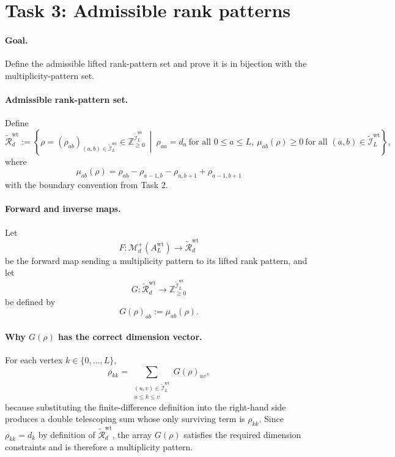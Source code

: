 \section*{Task 3: Admissible rank patterns}

\paragraph{Goal.}
Define the admissible lifted rank-pattern set and prove it is in bijection with
the multiplicity-pattern set.

\paragraph{Admissible rank-pattern set.}
Define
\[
\widetilde{\mathcal R}_d^{\mathrm{wt}}
:=
\left\{
\rho=(\rho_{ab})_{(a,b)\in \widetilde{\mathcal I}_L^{\mathrm{wt}}}
\in
\mathbb Z_{\ge 0}^{\widetilde{\mathcal I}_L^{\mathrm{wt}}}
\ \middle|\
\rho_{aa}=d_a\ \text{for all }0\le a\le L,\
\mu_{ab}(\rho)\ge 0\ \text{for all }(a,b)\in \widetilde{\mathcal I}_L^{\mathrm{wt}}
\right\},
\]
where
\[
\mu_{ab}(\rho)=\rho_{ab}-\rho_{a-1,b}-\rho_{a,b+1}+\rho_{a-1,b+1}
\]
with the boundary convention from Task 2.

\paragraph{Forward and inverse maps.}
Let
\[
F:\mathcal M_d^+(A_L^{\mathrm{wt}})\longrightarrow \widetilde{\mathcal R}_d^{\mathrm{wt}}
\]
be the forward map sending a multiplicity pattern to its lifted rank pattern,
and let
\[
G:\widetilde{\mathcal R}_d^{\mathrm{wt}}\longrightarrow \mathbb Z_{\ge 0}^{\widetilde{\mathcal I}_L^{\mathrm{wt}}}
\]
be defined by
\[
G(\rho)_{ab}:=\mu_{ab}(\rho).
\]

\paragraph{Why \(G(\rho)\) has the correct dimension vector.}
For each vertex \(k\in\{0,\dots,L\}\),
\[
\rho_{kk}
=
\sum_{\substack{(u,v)\in \widetilde{\mathcal I}_L^{\mathrm{wt}}\\ u\le k\le v}}
G(\rho)_{uv},
\]
because substituting the finite-difference definition into the right-hand side
produces a double telescoping sum whose only surviving term is \(\rho_{kk}\).
Since \(\rho_{kk}=d_k\) by definition of \(\widetilde{\mathcal R}_d^{\mathrm{wt}}\),
the array \(G(\rho)\) satisfies the required dimension constraints and is
therefore a multiplicity pattern.

